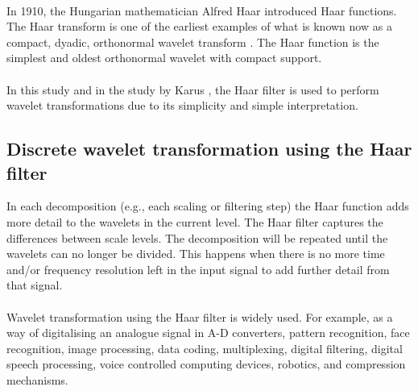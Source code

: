 \paragraph{}
In 1910, the Hungarian mathematician Alfred Haar introduced Haar functions. The
Haar transform is one of the earliest examples of what is known now as a
compact, dyadic, orthonormal wavelet transform \cite{stankovic}. The Haar function
is the simplest and oldest orthonormal wavelet with compact support.

\paragraph{}
In this study and in the study by Karus \cite{karus2013}, the Haar filter is
used to perform wavelet transformations due to its simplicity and simple
interpretation.

\subsection{Discrete wavelet transformation using the Haar filter}
In each decomposition (e.g., each scaling or filtering step) the Haar function
adds more detail to the wavelets in the current level. The Haar filter captures
the differences between scale levels. The decomposition will be repeated until
the wavelets can no longer be divided. This happens when there is no more time
and/or frequency resolution left in the input signal to add further detail from
that signal.

\paragraph{}
Wavelet transformation using the Haar filter is widely used. For example, as a
way of digitalising an analogue signal in A-D converters, pattern recognition,
face recognition, image processing, data coding, multiplexing, digital
filtering, digital speech processing, voice controlled computing devices,
robotics, and compression mechanisms.

\begin{comment}
This chapter contains all the information needed to put the thesis into
context. It is common to use (a revised version) of your literature survey for
this purpose.
It is important to refer from your text to sources you have used, as listed in
your bibliography section (appendix). For example, “XP is a recent agile
development method [1]” is a common style of doing this, where the following
entry would be included in your bibliography:
[1] K. Beck, E. Gamma, Test infected: Programmers love writing tests, Java
Report 3 (7) (1998) 51–56.
If you want to refer to books you have read as part of the curriculum, you can
also do so in this way.
Have a look at Chapter 2 of this example thesis at Paul’s
homepage\footnote{http://homepages.cwi.nl/~paulk/thesesMasterSoftwareEngineering/2006/RichardKettelerij.pdf}.
\end{comment}